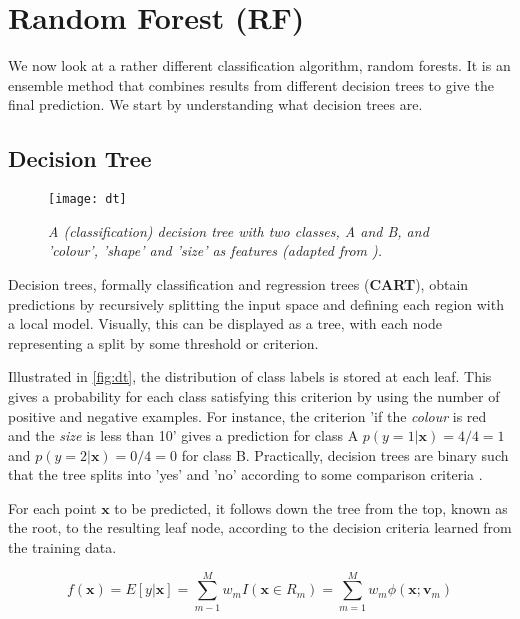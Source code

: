 \newpage
\section{Random Forest (RF)} \label{sec:tech-rf}

We now look at a rather different classification algorithm, random forests. It is an ensemble method that combines results from different decision trees to give the final prediction. We start by understanding what decision trees are.

\subsection{Decision Tree}
\begin{figure}[H]
  \centering
  \texttt{[image: dt]}
  \caption{\textit{A (classification) decision tree with two classes, A and B,  and 'colour', 'shape' and 'size' as features (adapted from \protect{}).}}
  \label{fig:dt}
\end{figure}

Decision trees, formally classification and regression trees (\textbf{CART}), obtain predictions by recursively splitting the input space and defining each region with a local model. Visually, this can be displayed as a tree, with each node representing a split by some threshold or criterion. 

Illustrated in \autoref{fig:dt}, the distribution of class labels is stored at each leaf. This gives a probability for each class satisfying this criterion by using the number of positive and negative examples. For instance, the criterion 'if the \textit{colour} is red and the \textit{size} is less than 10' gives a prediction for class A $p(y=1|\mathbf{x}) = 4/4 = 1$ and $p(y=2|\mathbf{x}) = 0/4 = 0$ for class B. Practically, decision trees are binary such that the tree splits into 'yes' and 'no' according to some comparison criteria \cite{mur-book}.

For each point $\mathbf{x}$ to be predicted, it follows down the tree from the top, known as the root, to the resulting leaf node, according to the decision criteria learned from the training data.

\begin{equation} \label{eq:dt}
  f(\mathbf{x}) = E[y|\mathbf{x}] = \sum_{m-1}^{M} w_m I(\mathbf{x} \in R_m)
                                  = \sum_{m=1}^{M} w_m \phi(\mathbf{x}; \mathbf{v}_m)
\end{equation}

